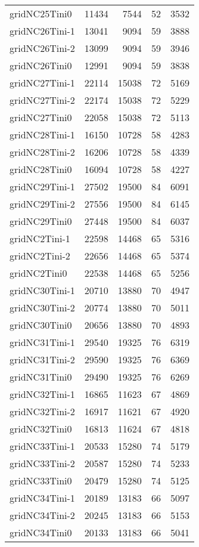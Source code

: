 \begin{longtable}{lrrrr}
gridNC25Tini0 & 11434 & 7544 & 52 & 3532 \\
gridNC26Tini-1 & 13041 & 9094 & 59 & 3888 \\
gridNC26Tini-2 & 13099 & 9094 & 59 & 3946 \\
gridNC26Tini0 & 12991 & 9094 & 59 & 3838 \\
gridNC27Tini-1 & 22114 & 15038 & 72 & 5169 \\
gridNC27Tini-2 & 22174 & 15038 & 72 & 5229 \\
gridNC27Tini0 & 22058 & 15038 & 72 & 5113 \\
gridNC28Tini-1 & 16150 & 10728 & 58 & 4283 \\
gridNC28Tini-2 & 16206 & 10728 & 58 & 4339 \\
gridNC28Tini0 & 16094 & 10728 & 58 & 4227 \\
gridNC29Tini-1 & 27502 & 19500 & 84 & 6091 \\
gridNC29Tini-2 & 27556 & 19500 & 84 & 6145 \\
gridNC29Tini0 & 27448 & 19500 & 84 & 6037 \\
gridNC2Tini-1 & 22598 & 14468 & 65 & 5316 \\
gridNC2Tini-2 & 22656 & 14468 & 65 & 5374 \\
gridNC2Tini0 & 22538 & 14468 & 65 & 5256 \\
gridNC30Tini-1 & 20710 & 13880 & 70 & 4947 \\
gridNC30Tini-2 & 20774 & 13880 & 70 & 5011 \\
gridNC30Tini0 & 20656 & 13880 & 70 & 4893 \\
gridNC31Tini-1 & 29540 & 19325 & 76 & 6319 \\
gridNC31Tini-2 & 29590 & 19325 & 76 & 6369 \\
gridNC31Tini0 & 29490 & 19325 & 76 & 6269 \\
gridNC32Tini-1 & 16865 & 11623 & 67 & 4869 \\
gridNC32Tini-2 & 16917 & 11621 & 67 & 4920 \\
gridNC32Tini0 & 16813 & 11624 & 67 & 4818 \\
gridNC33Tini-1 & 20533 & 15280 & 74 & 5179 \\
gridNC33Tini-2 & 20587 & 15280 & 74 & 5233 \\
gridNC33Tini0 & 20479 & 15280 & 74 & 5125 \\
gridNC34Tini-1 & 20189 & 13183 & 66 & 5097 \\
gridNC34Tini-2 & 20245 & 13183 & 66 & 5153 \\
gridNC34Tini0 & 20133 & 13183 & 66 & 5041 \\

\end{longtable}
